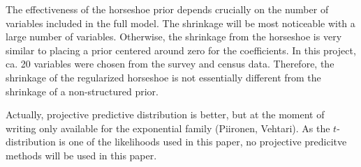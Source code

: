 The effectiveness of the horseshoe prior depends crucially on the number of variables included in the full model.
The shrinkage will be most noticeable with a large number of variables.
Otherwise, the shrinkage from the horseshoe is very similar to placing a prior centered around zero for the coefficients.
In this project, ca. 20 variables were chosen from the survey and census data.
Therefore, the shrinkage of the regularized horseshoe is not essentially different from the shrinkage of a non-structured prior.

Actually, projective predictive distribution is better, but at the moment of writing only available for the exponential family (Piironen, Vehtari).
As the $t$-distribution is one of the likelihoods used in this paper, no projective predicitve methods will be used in this paper.

